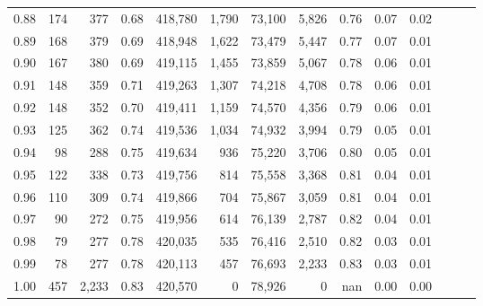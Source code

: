 \begin{tabular}{rrrrrrrrrrrrrr}
0.88 &     174 &    377 &  0.68 &  418,780 &    1,790 &  73,100 &   5,826 &  0.76 &  0.07 &      0.02 \\
0.89 &     168 &    379 &  0.69 &  418,948 &    1,622 &  73,479 &   5,447 &  0.77 &  0.07 &      0.01 \\
0.90 &     167 &    380 &  0.69 &  419,115 &    1,455 &  73,859 &   5,067 &  0.78 &  0.06 &      0.01 \\
0.91 &     148 &    359 &  0.71 &  419,263 &    1,307 &  74,218 &   4,708 &  0.78 &  0.06 &      0.01 \\
0.92 &     148 &    352 &  0.70 &  419,411 &    1,159 &  74,570 &   4,356 &  0.79 &  0.06 &      0.01 \\
0.93 &     125 &    362 &  0.74 &  419,536 &    1,034 &  74,932 &   3,994 &  0.79 &  0.05 &      0.01 \\
0.94 &      98 &    288 &  0.75 &  419,634 &      936 &  75,220 &   3,706 &  0.80 &  0.05 &      0.01 \\
0.95 &     122 &    338 &  0.73 &  419,756 &      814 &  75,558 &   3,368 &  0.81 &  0.04 &      0.01 \\
0.96 &     110 &    309 &  0.74 &  419,866 &      704 &  75,867 &   3,059 &  0.81 &  0.04 &      0.01 \\
0.97 &      90 &    272 &  0.75 &  419,956 &      614 &  76,139 &   2,787 &  0.82 &  0.04 &      0.01 \\
0.98 &      79 &    277 &  0.78 &  420,035 &      535 &  76,416 &   2,510 &  0.82 &  0.03 &      0.01 \\
0.99 &      78 &    277 &  0.78 &  420,113 &      457 &  76,693 &   2,233 &  0.83 &  0.03 &      0.01 \\
1.00 &     457 &  2,233 &  0.83 &  420,570 &        0 &  78,926 &       0 &   nan &  0.00 &      0.00 \\
\bottomrule
\end{tabular}
